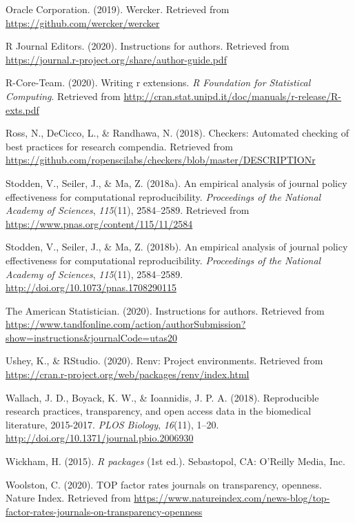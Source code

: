\documentclass[12pt,twoside]{reedthesis}
\begin{document}
\hypertarget{ref-wercker}{}
Oracle Corporation. (2019). Wercker. Retrieved from
\url{https://github.com/wercker/wercker}

\hypertarget{ref-r-journal}{}
R Journal Editors. (2020). Instructions for authors. Retrieved from
\url{https://journal.r-project.org/share/author-guide.pdf}

\hypertarget{ref-coreteam-extensions}{}
R-Core-Team. (2020). Writing r extensions. \emph{R Foundation for
Statistical Computing}. Retrieved from
\url{http://cran.stat.unipd.it/doc/manuals/r-release/R-exts.pdf}

\hypertarget{ref-R-checkers}{}
Ross, N., DeCicco, L., \& Randhawa, N. (2018). Checkers: Automated
checking of best practices for research compendia. Retrieved from
\url{https://github.com/ropenscilabs/checkers/blob/master/DESCRIPTIONr}

\hypertarget{ref-policy-effectiveness}{}
Stodden, V., Seiler, J., \& Ma, Z. (2018a). An empirical analysis of
journal policy effectiveness for computational reproducibility.
\emph{Proceedings of the National Academy of Sciences}, \emph{115}(11),
2584--2589. Retrieved from
\url{https://www.pnas.org/content/115/11/2584}

\hypertarget{ref-Stodden2584}{}
Stodden, V., Seiler, J., \& Ma, Z. (2018b). An empirical analysis of
journal policy effectiveness for computational reproducibility.
\emph{Proceedings of the National Academy of Sciences}, \emph{115}(11),
2584--2589. \url{http://doi.org/10.1073/pnas.1708290115}

\hypertarget{ref-ams-guide}{}
The American Statistician. (2020). Instructions for authors. Retrieved
from
\url{https://www.tandfonline.com/action/authorSubmission?show=instructions\&journalCode=utas20}

\hypertarget{ref-R-renv}{}
Ushey, K., \& RStudio. (2020). Renv: Project environments. Retrieved
from \url{https://cran.r-project.org/web/packages/renv/index.html}

\hypertarget{ref-plos-biology}{}
Wallach, J. D., Boyack, K. W., \& Ioannidis, J. P. A. (2018).
Reproducible research practices, transparency, and open access data in
the biomedical literature, 2015-2017. \emph{PLOS Biology},
\emph{16}(11), 1--20. \url{http://doi.org/10.1371/journal.pbio.2006930}

\hypertarget{ref-hadley-packages}{}
Wickham, H. (2015). \emph{R packages} (1st ed.). Sebastopol, CA:
O'Reilly Media, Inc.

\hypertarget{ref-top-guidelines}{}
Woolston, C. (2020). TOP factor rates journals on transparency,
openness. Nature Index. Retrieved from
\url{https://www.natureindex.com/news-blog/top-factor-rates-journals-on-transparency-openness}


\end{document}
